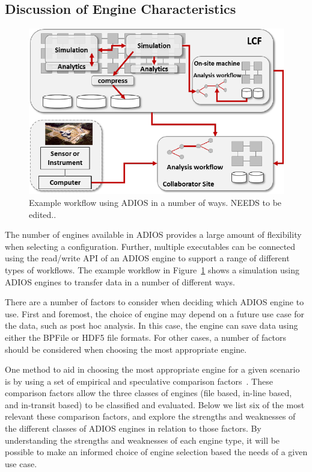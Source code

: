 \subsection{Discussion of Engine Characteristics}
\begin{figure}[b]
\sidecaption
\includegraphics[scale=.75]{figures/ExampleWorkflow.pdf}
\caption{Example workflow using ADIOS in a number of ways. NEEDS to be edited..}
\label{fig:example_workflow}
\end{figure}

The number of engines available in ADIOS provides a large amount of flexibility when selecting a configuration. Further, multiple executables can be connected using the read/write API of an ADIOS engine to support a range of different types of workflows. The example workflow in Figure~\ref{fig:example_workflow} shows a simulation using ADIOS engines to transfer data in a number of different ways. 

There are a number of factors to consider when deciding which ADIOS engine to use. First and foremost, the choice of engine may depend on a future use case for the data, such as post hoc analysis. In this case, the engine can save data using either the BPFile or HDF5 file formats. For other cases, a number of factors should be considered when choosing the most appropriate engine.

One method to aid in choosing the most appropriate engine for a given scenario is by using a set of empirical and speculative comparison factors~\cite{Kress-isav15}. These comparison factors allow the three classes of engines (file based, in-line based, and in-transit based) to be classified and evaluated.  Below we list six of the most relevant these comparison factors, and explore the strengths and weaknesses of the different classes of ADIOS engines in relation to those factors. By understanding the strengths and weaknesses of each engine type, it will be possible to make an informed choice of engine selection based the needs of a given use case.

